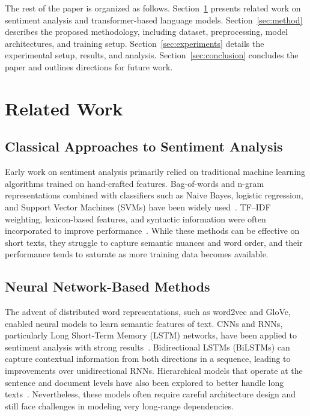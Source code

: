 \documentclass[conference]{IEEEtran}
\begin{document}
The rest of the paper is organized as follows. Section~\ref{sec:related} presents related work on sentiment analysis and transformer-based language models. Section~\ref{sec:method} describes the proposed methodology, including dataset, preprocessing, model architectures, and training setup. Section~\ref{sec:experiments} details the experimental setup, results, and analysis. Section~\ref{sec:conclusion} concludes the paper and outlines directions for future work.

\section{Related Work}
\label{sec:related}

\subsection{Classical Approaches to Sentiment Analysis}
Early work on sentiment analysis primarily relied on traditional machine learning algorithms trained on hand-crafted features. Bag-of-words and n-gram representations combined with classifiers such as Naive Bayes, logistic regression, and Support Vector Machines (SVMs) have been widely used~\cite{pang2002thumbs}. TF--IDF weighting, lexicon-based features, and syntactic information were often incorporated to improve performance~\cite{wang2012baselines}. While these methods can be effective on short texts, they struggle to capture semantic nuances and word order, and their performance tends to saturate as more training data becomes available.

\subsection{Neural Network-Based Methods}
The advent of distributed word representations, such as word2vec and GloVe, enabled neural models to learn semantic features of text. CNNs and RNNs, particularly Long Short-Term Memory (LSTM) networks, have been applied to sentiment analysis with strong results~\cite{kim2014convolutional}. Bidirectional LSTMs (BiLSTMs) can capture contextual information from both directions in a sequence, leading to improvements over unidirectional RNNs. Hierarchical models that operate at the sentence and document levels have also been explored to better handle long texts~\cite{yang2016hierarchical}. Nevertheless, these models often require careful architecture design and still face challenges in modeling very long-range dependencies.
\end{document}
